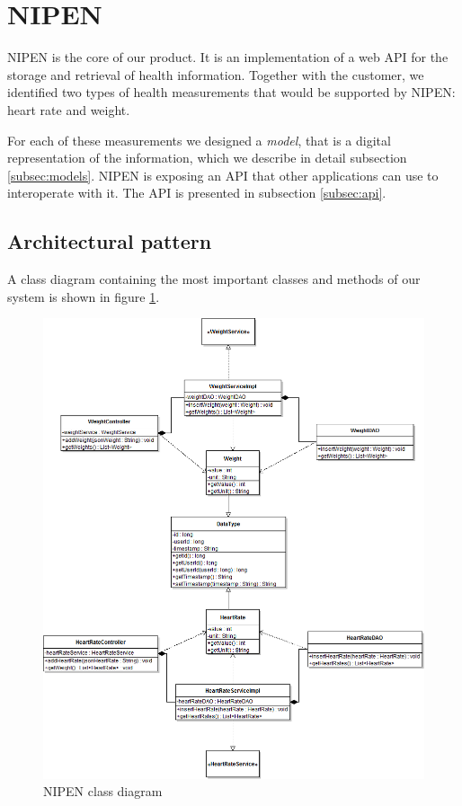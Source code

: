 \section{NIPEN}

NIPEN is the core of our product. 
It is an implementation of a web API for the storage and retrieval of health information.
Together with the customer, we identified two types of health measurements that would be supported by NIPEN: heart rate and weight.

For each of these measurements we designed a \textit{model}, that is a digital representation of the information, which we describe in detail subsection \ref{subsec:models}.
NIPEN is exposing an API that other applications can use to interoperate with it.
The API is presented in subsection \ref{subsec:api}.

\subsection{Architectural pattern}

A class diagram containing the most important classes and methods of our system is shown in figure \ref{figure:nipen-class-diagram}.

\begin{figure}[h]
\centering
\includegraphics[scale=0.5]{../Figures/NIPEN-class-diagram.png}
\caption{NIPEN class diagram}
\label{figure:nipen-class-diagram}
\end{figure}

